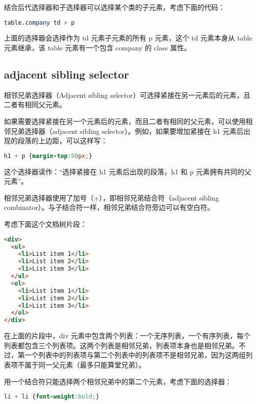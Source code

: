 结合后代选择器和子选择器可以选择某个类的子元素，考虑下面的代码：

\begin{lstlisting}[language=CSS]
table.company td > p
\end{lstlisting}

上面的选择器会选择作为 td 元素子元素的所有 p 元素，这个 td 元素本身从 table 元素继承，该 table 元素有一个包含 company 的 class 属性。


\subsection{adjacent sibling selector}

相邻兄弟选择器（Adjacent sibling selector）可选择紧接在另一元素后的元素，且二者有相同父元素。

如果需要选择紧接在另一个元素后的元素，而且二者有相同的父元素，可以使用相邻兄弟选择器（adjacent sibling selector）。例如，如果要增加紧接在 h1 元素后出现的段落的上边距，可以这样写：

\begin{lstlisting}[language=CSS]
h1 + p {margin-top:50px;}
\end{lstlisting}

这个选择器读作：“选择紧接在 h1 元素后出现的段落，h1 和 p 元素拥有共同的父元素”。


相邻兄弟选择器使用了加号（+），即相邻兄弟结合符（adjacent sibling combinator）。与子结合符一样，相邻兄弟结合符旁边可以有空白符。

考虑下面这个文档树片段：


\begin{lstlisting}[language=HTML]
<div>
  <ul>
    <li>List item 1</li>
    <li>List item 2</li>
    <li>List item 3</li>
  </ul>
  <ol>
    <li>List item 1</li>
    <li>List item 2</li>
    <li>List item 3</li>
  </ol>
</div>
\end{lstlisting}

在上面的片段中，div 元素中包含两个列表：一个无序列表，一个有序列表，每个列表都包含三个列表项。这两个列表是相邻兄弟，列表项本身也是相邻兄弟。不过，第一个列表中的列表项与第二个列表中的列表项不是相邻兄弟，因为这两组列表项不属于同一父元素（最多只能算堂兄弟）。

用一个结合符只能选择两个相邻兄弟中的第二个元素，考虑下面的选择器：


\begin{lstlisting}[language=CSS]
li + li {font-weight:bold;}
\end{lstlisting}



